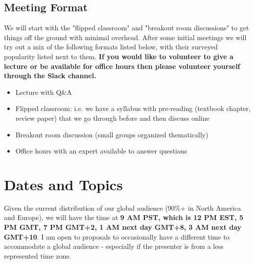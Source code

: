 \documentclass[11pt, oneside]{article}   	%
\begin{document}
\subsection{Meeting Format}
We will start with the "flipped classroom" and "breakout room discussions" to get things off the ground with minimal overhead. After some initial meetings we will try out a mix of the following formats listed below, with their surveyed popularity  listed next to them. {\bf If you would like to volunteer to give a lecture or be available for office hours then please volunteer yourself through the Slack channel.}
\begin{itemize}
	\item Lecture with Q\&A
	\item Flipped classroom: i.e. we have a syllabus with pre-reading (textbook chapter, review paper) that we go through before and then discuss online
	\item Breakout room discussion (small groups organized thematically)
	\item Office hours with an expert available to answer questions
\end{itemize}

\section{Dates and Topics}
Given the current distribution of our global audience (90\%+  in North America and Europe), we will have the time at {\bf 9 AM PST, which is 12 PM EST, 5 PM GMT, 7 PM GMT+2, 1 AM next day GMT+8, 3 AM next day GMT+10}. I am open to proposals to occasionally have a different time to accommodate a global audience - especially if the presenter is from a less represented time zone.
\end{document}
